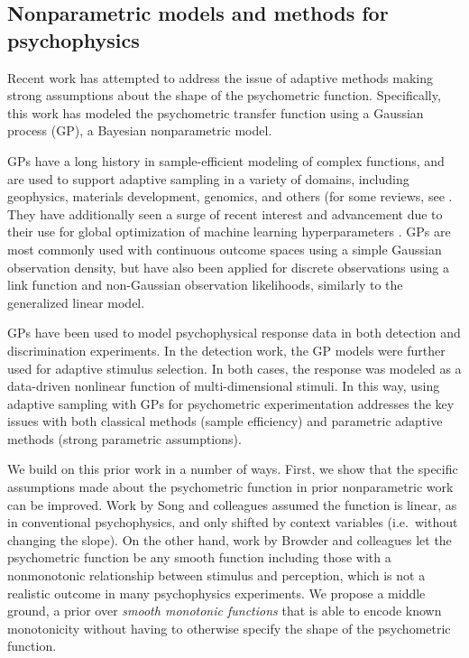 \documentclass[../main.tex]{subfiles}
\begin{document}
\subsection{Nonparametric models and methods for psychophysics}

Recent work has attempted to address the issue of adaptive methods making strong assumptions about the shape of the psychometric function. Specifically, this work has modeled the psychometric transfer function using a Gaussian process (GP), a Bayesian nonparametric model.

GPs have a long history in sample-efficient modeling of complex functions, and are used to support adaptive sampling in a variety of domains, including geophysics, materials development, genomics, and others (for some reviews, see \citet{Brochu2010ATO,Frazier2018,Deisenroth2015}. They have additionally seen a surge of recent interest and advancement due to their use for global optimization of machine learning hyperparameters \citep[e.g][]{Snoek2012,Balandat2020}. GPs are most commonly used with continuous outcome spaces using a simple Gaussian observation density, but have also been applied for discrete observations using a link function and non-Gaussian observation likelihoods, similarly to the generalized linear model.

GPs have been used to model psychophysical response data in both detection \citep{Song2018,Song2017b,Gardner2015a,Schlittenlacher2018,Schlittenlacher2020} and discrimination \citep{Browder2019} experiments. In the detection work, the GP models were further used for adaptive stimulus selection. In both cases, the response was modeled as a data-driven nonlinear function of multi-dimensional stimuli. In this way, using adaptive sampling with GPs for psychometric experimentation addresses the key issues with both classical methods (sample efficiency) and parametric adaptive methods (strong parametric assumptions).

We build on this prior work in a number of ways. First, we show that the specific assumptions made about the
psychometric function in prior nonparametric work can be improved. Work by Song and colleagues assumed the function is linear, as in conventional psychophysics, and only shifted by context variables (i.e.\ without changing the slope). On the other hand, work by Browder and colleagues let the psychometric function be any smooth function including those with a nonmonotonic relationship between stimulus and perception, which is not a realistic outcome in many psychophysics experiments. We propose a middle ground, a prior over \emph{smooth monotonic functions} that is able to encode known monotonicity without having to otherwise specify the shape of the psychometric function.
\end{document}
